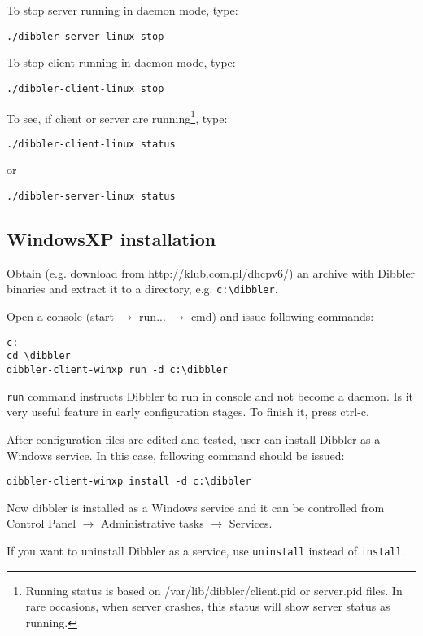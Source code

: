 To stop server running in daemon mode, type:
\begin{verbatim}
./dibbler-server-linux stop
\end{verbatim}

To stop client running in daemon mode, type:
\begin{verbatim}
./dibbler-client-linux stop
\end{verbatim}

To see, if client or server are running\footnote{Running status is
  based on /var/lib/dibbler/client.pid or server.pid files. In rare
  occasions, when server crashes, this status will show server status as running.}, type:
\begin{verbatim}
./dibbler-client-linux status
\end{verbatim}

or
\begin{verbatim}
./dibbler-server-linux status
\end{verbatim}

\subsection{WindowsXP installation}
Obtain (e.g. download from \url{http://klub.com.pl/dhcpv6/}) an archive with
Dibbler binaries and extract it to a directory, e.g. \verb+c:\dibbler+.

Open a console (start $\rightarrow$ run... $\rightarrow$ cmd) and
issue following commands:

\begin{verbatim}
c:
cd \dibbler
dibbler-client-winxp run -d c:\dibbler
\end{verbatim}

\verb+run+ command instructs Dibbler to run in console and not become a
daemon. Is it very useful feature in early configuration stages. To
finish it, press ctrl-c. 

After configuration files are edited and tested, user can install Dibbler as a
Windows service. In this case, following command should be issued:
\begin{verbatim}
dibbler-client-winxp install -d c:\dibbler
\end{verbatim}

Now dibbler is installed as a Windows service and it can be controlled
from Control Panel $\rightarrow$ Administrative tasks $\rightarrow$
Services. 

If you want to uninstall Dibbler as a service, use \verb+uninstall+
instead of \verb+install+.

